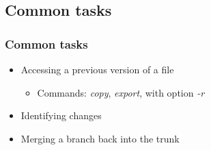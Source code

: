 \documentclass{beamer}
\begin{document}
\subsection{Common tasks}

{
  \frametitle{Common tasks}
  
  \begin{itemize}
  \item<1-> Accessing a previous version of a file
  	\begin{itemize}
	\item<1-> Commands: \textit{copy}, \textit{export}, with option \textit{-r}
	\end{itemize}
  \item<2-> Identifying changes
  \item<3-> Merging a branch back into the trunk
  \end{itemize}
  
}  
\end{document}
